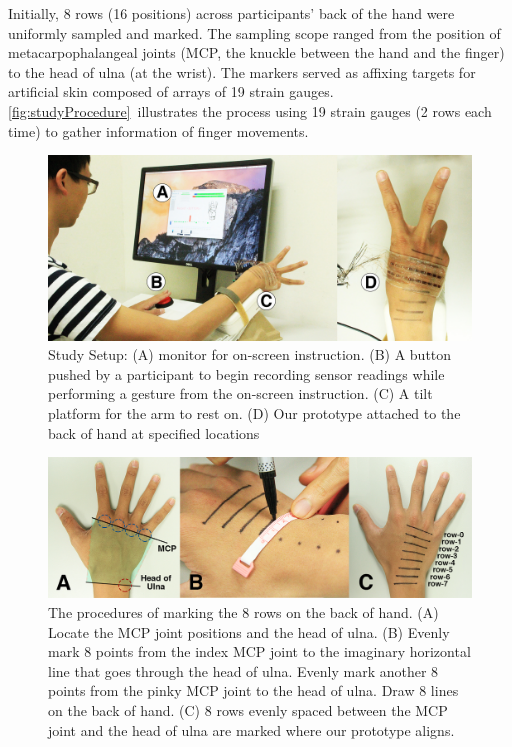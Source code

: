 \documentclass{sigchi}
\begin{document}
Initially, 8 rows (16 positions) across participants’ back of the hand were uniformly sampled and marked. The sampling scope ranged from the position of metacarpophalangeal joints (MCP, the knuckle between the hand and the finger) to the head of ulna (at the wrist).%
 The markers served as affixing targets for artificial skin composed of arrays of 19 strain gauges. 
\autoref{fig:studyProcedure}\ illustrates the process using 19 strain gauges (2 rows each time) to gather information of finger movements.

\begin{figure}
  \includegraphics[width=1\columnwidth]{figures/StudyEnv.jpg}
  \caption{Study Setup:
            (A) monitor for on-screen instruction.
            (B) A button pushed by a participant to begin recording sensor readings while performing a gesture from the on-screen instruction.
            (C) A tilt platform for the arm to rest on.
            (D) Our prototype attached to the back of hand at specified locations }
  \label{fig:StudyEnv}
\end{figure}

\begin{figure}
  \begin{center}
  \includegraphics[width=1\columnwidth]{figures/studyProcedure.jpg}
  \caption{The procedures of marking the 8 rows on the back of hand.
          (A) Locate the MCP joint positions and the head of ulna. 
          (B) Evenly mark 8 points from the index MCP joint to the imaginary horizontal line that goes through the head of ulna. Evenly mark another 8 points from the pinky MCP joint to the head of ulna. Draw 8 lines on the back of hand.
          (C) 8 rows evenly spaced between the MCP joint and the head of ulna are marked where our prototype aligns.
  }
  \label{fig:studyProcedure}
  \end{center}
\end{figure}
\end{document}
